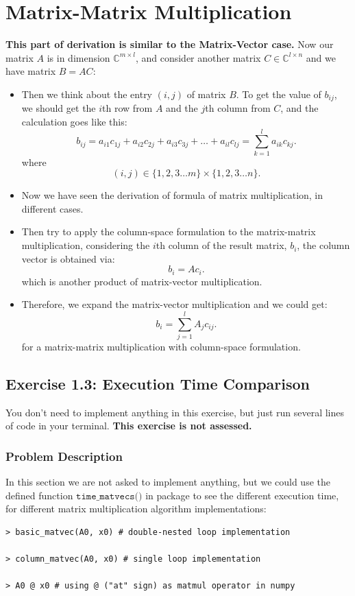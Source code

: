 \section{Matrix-Matrix Multiplication}%
\textbf{This part of derivation is similar to the Matrix-Vector case.} Now our matrix $A$ is in dimension $\mathbb{C}^{m \times l}$, and consider another matrix $C \in \mathbb{C}^{l \times n}$ and we have matrix $B = AC$:
\begin{itemize}
  \item Then we think about the entry $(i, j)$ of matrix $B$. To get the value of $b_{ij}$, we should get the $i$th row from $A$ and the $j$th column from $C$, and the calculation goes like this:
    \[
      b_{ij} = a_{i1}c_{1j} + a_{i2}c_{2j} + a_{i3}c_{3j} + \ldots +  a_{il}c_{lj} = \sum_{k = 1}^{l} a_{ik}c_{kj}
    .\] 
    where
    \[
      (i, j) \in \{1, 2, 3 \ldots m\} \times \{1, 2, 3 \ldots n\} 
    .\]
    \item Now we have seen the derivation of formula of matrix multiplication, in different cases.
    \item Then try to apply the column-space formulation to the matrix-matrix multiplication, considering the $i$th column of the result matrix, $b_i$, the column vector is obtained via:
    \[
    b_i = A c_i
    .\] 
    which is another product of matrix-vector multiplication.
    \item Therefore, we expand the matrix-vector multiplication and we could get:
    \[
    b_i = \sum_{j=1}^{l} A_j c_{ij}
    .\]
    for a matrix-matrix multiplication with column-space formulation.

\end{itemize}
\subsection*{Exercise 1.3: Execution Time Comparison}%
You don't need to implement anything in this exercise, but just run several lines of code in your terminal. \textbf{This exercise is not assessed.}
\subsubsection*{Problem Description}
In this section we are not asked to implement anything, but we could use the defined function $\texttt{time\_matvecs()}$ in package to see the different execution time, for different matrix multiplication algorithm implementations:
\begin{lstlisting}
> basic_matvec(A0, x0) # double-nested loop implementation

> column_matvec(A0, x0) # single loop implementation

> A0 @ x0 # using @ ("at" sign) as matmul operator in numpy
\end{lstlisting}
